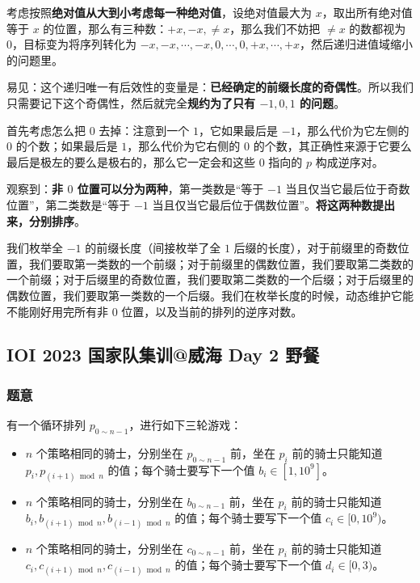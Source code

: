 \documentclass[12pt, a4paper, oneside]{ctexart}
\begin{document}
考虑按照\textbf{绝对值从大到小考虑每一种绝对值}，设绝对值最大为 $x$，取出所有绝对值等于 $x$ 的位置，那么有三种数：$+x,-x,\neq x$，那么我们不妨把 $\neq x$ 的数都视为 $0$，目标变为将序列转化为 $-x,-x,\cdots,-x,0,\cdots,0,+x,\cdots,+x$，然后递归进值域缩小的问题里。

易见：这个递归唯一有后效性的变量是：\textbf{已经确定的前缀长度的奇偶性}。所以我们只需要记下这个奇偶性，然后就完全\textbf{规约为了只有 $-1,0,1$ 的问题}。

首先考虑怎么把 $0$ 去掉：注意到一个 $1$，它如果最后是 $-1$，那么代价为它左侧的 $0$ 的个数；如果最后是 $1$，那么代价为它右侧的 $0$ 的个数，其正确性来源于它要么最后是极左的要么是极右的，那么它一定会和这些 $0$ 指向的 $p$ 构成逆序对。

观察到：\textbf{非 $0$ 位置可以分为两种}，第一类数是“等于 $-1$ 当且仅当它最后位于奇数位置”，第二类数是“等于 $-1$ 当且仅当它最后位于偶数位置”。\textbf{将这两种数提出来，分别排序}。

我们枚举全 $-1$ 的前缀长度（间接枚举了全 $1$ 后缀的长度），对于前缀里的奇数位置，我们要取第一类数的一个前缀；对于前缀里的偶数位置，我们要取第二类数的一个前缀；对于后缀里的奇数位置，我们要取第二类数的一个后缀；对于后缀里的偶数位置，我们要取第一类数的一个后缀。我们在枚举长度的时候，动态维护它能不能刚好用完所有非 $0$ 位置，以及当前的排列的逆序对数。

\subsection{IOI 2023 国家队集训@威海 Day 2 野餐}

\subsubsection{题意}

有一个循环排列 $p_{0\sim n-1}$，进行如下三轮游戏：

\begin{itemize}
    \item $n$ 个策略相同的骑士，分别坐在 $p_{0\sim n-1}$ 前，坐在 $p_i$ 前的骑士只能知道 $p_i,p_{(i+1)\bmod n}$ 的值；每个骑士要写下一个值 $b_i\in[1,10^9]$。
    \item $n$ 个策略相同的骑士，分别坐在 $b_{0\sim n-1}$ 前，坐在 $p_i$ 前的骑士只能知道 $b_i,b_{(i+1)\bmod n},b_{(i-1)\bmod n}$ 的值；每个骑士要写下一个值 $c_i\in[0,10^9)$。
    \item $n$ 个策略相同的骑士，分别坐在 $c_{0\sim n-1}$ 前，坐在 $p_i$ 前的骑士只能知道 $c_i,c_{(i+1)\bmod n},c_{(i-1)\bmod n}$ 的值；每个骑士要写下一个值 $d_i\in[0,3)$。
\end{itemize}
\end{document}
